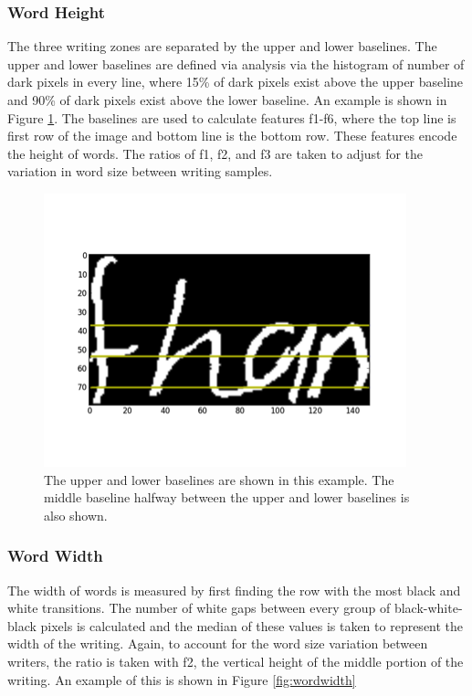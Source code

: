 \documentclass[paper=a4, fontsize=11pt]{scrartcl} %
\numberwithin{equation}{section} %
\numberwithin{figure}{section} %
\numberwithin{table}{section} %
\begin{document}
\subsubsection{Word Height}
The three writing zones are separated by the upper and lower
baselines. The upper and lower baselines are defined via analysis via
the histogram of number of dark pixels in every line, where 15\% of
dark pixels exist above the upper baseline and 90\% of dark pixels
exist above the lower baseline. An example is shown in Figure \ref{fig:wordheight}. The baselines are used to calculate
features f1-f6, where the top line is first row of the image and
bottom line is the bottom row. These features encode the height of
words. The ratios of f1, f2, and f3 are taken to adjust for the
variation in word size between writing samples.

\begin{figure}
  \includegraphics{wordheight.png}
  \caption{The upper and lower baselines are shown in this example. The middle baseline halfway between the upper and lower baselines is also shown.}
  \label{fig:wordheight}
\end{figure}

\subsubsection{Word Width}
The width of words is measured by first finding the row with the most
black and white transitions. The number of white gaps between every
group of black-white-black pixels is calculated and the median of
these values is taken to represent the width of the writing. Again, to
account for the word size variation between writers, the ratio is
taken with f2, the vertical height of the middle portion of the
writing. An example of this is shown in Figure \ref{fig:wordwidth}
\end{document}
